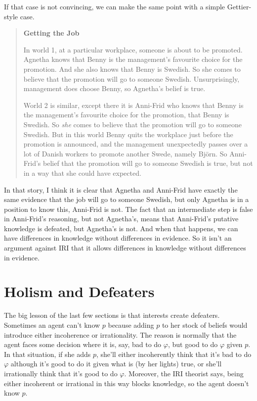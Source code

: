 \documentclass[oneside, a4paper]{book}
\begin{document}
If that case is not convincing, we can make the same point with a simple Gettier-style case.

\begin{quote}
\textbf{Getting the Job}

In world 1, at a particular workplace, someone is about to be promoted. Agnetha knows that Benny is the management's favour\-ite choice for the promotion. And she also knows that Benny is Swedish. So she comes to believe that the promotion will go to someone Swedish. Unsurprisingly, management does choose Benny, so Agnetha's belief is true.

World 2 is similar, except there it is Anni-Frid who knows that Benny is the management's favourite choice for the promotion, that Benny is Swedish. So \textit{she} comes to believe that the promotion will go to someone Swedish. But in this world Benny quits the workplace just before the promotion is announced, and the management unexpectedly passes over a lot of Danish workers to promote another Swede, namely Bj\"orn. So Anni-Frid's belief that the  promotion will go to someone Swedish is true, but not in a way that she could have expected.
\end{quote}

\noindent In that story, I think it is clear that Agnetha and Anni-Frid have exactly the same evidence that the job will go to someone Swedish, but only Agnetha is in a position to know this, Anni-Frid is not. The fact that an intermediate step is false in Anni-Frid's reasoning, but not Agnetha's, means that Anni-Frid's putative knowledge is defeated, but Agnetha's is not. And when that happens, we can have differences in knowledge without differences in evidence. So it isn't an argument against IRI that it allows differences in knowledge without differences in evidence.

\section{Holism and Defeaters} \label{sect:holism}
The big lesson of the last few sections is that interests create defeaters. Sometimes an agent can't know $p$ because adding $p$ to her stock of beliefs would introduce either incoherence or irrationality. The reason is normally that the agent faces some decision where it is, say, bad to do $\varphi$, but good to do $\varphi$ given $p$. In that situation, if she adds $p$, she'll either incoherently think that it's bad to do $\varphi$ although it's good to do it given what is (by her lights) true, or she'll irrationally think that it's good to do $\varphi$. Moreover, the IRI theorist says, being either incoherent or irrational in this way blocks knowledge, so the agent doesn't know $p$.
\end{document}
